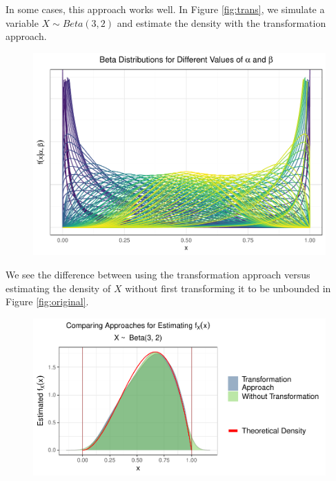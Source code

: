 \documentclass[12pt,twoside]{smiththesis}
\begin{document}
In some cases, this approach works well. In Figure \ref{fig:trans}, we simulate a variable \(X \sim Beta(3,2)\) and estimate the density with the transformation approach.
\begin{figure}

{\centering \includegraphics[width=1\linewidth]{thesis_files/figure-latex/unnamed-chunk-33-1} 

}

\caption{\label{fig:trans}}\label{fig:unnamed-chunk-33}
\end{figure}
We see the difference between using the transformation approach versus estimating the density of \(X\) without first transforming it to be unbounded in Figure \ref{fig:original}.
\begin{figure}

{\centering \includegraphics[width=1\linewidth]{thesis_files/figure-latex/create-fig-original-1} 

}

\caption{\label{fig:original}}\label{fig:create-fig-original}
\end{figure}
\end{document}
